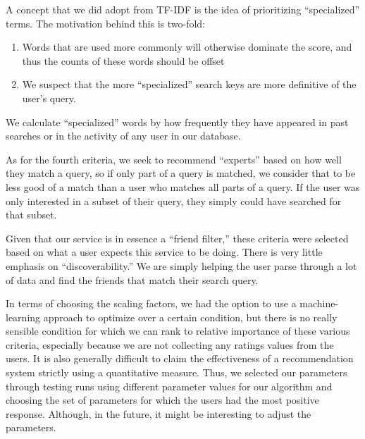 A concept that we did adopt from TF-IDF is the idea of prioritizing
``specialized'' terms. The motivation behind this is two-fold: \begin{enumerate}
\item Words that are used more commonly will otherwise dominate the score, and
thus the counts of these words should be offset
\item We suspect that the more ``specialized'' search keys are more definitive
of the user's query.
\end{enumerate}

We calculate ``specialized'' words by how frequently they have appeared in past
searches or in the activity of any user in our database.

As for the fourth criteria, we seek to recommend ``experts'' based on how well
they match a query, so if only part of a query is matched, we consider that to
be less good of a match than a user who matches all parts of a query. If the
user was only interested in a subset of their query, they simply could have
searched for that subset.

Given that our service is in essence a ``friend filter,'' these criteria were
selected based on what a user expects this service to be doing. There is very
little emphasis on ``discoverability.'' We are simply helping the user parse
through a lot of data and find the friends that match their search query.

In terms of choosing the scaling factors, we had the option to use a
machine-learning approach to optimize over a certain condition, but there is no
really sensible condition for which we can rank to relative importance of these
various criteria, especially because we are not collecting any ratings values
from the users. It is also generally difficult to claim the effectiveness of a
recommendation system strictly using a quantitative measure. Thus, we selected
our parameters through testing runs using different parameter values for our
algorithm and choosing the set of parameters for which the users had the most
positive response. Although, in the future, it might be interesting to adjust
the parameters.



